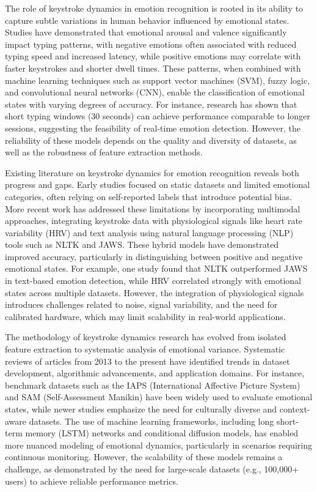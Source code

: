 \documentclass[conference]{IEEEtran}
\begin{document}
The role of keystroke dynamics in emotion recognition is rooted in its ability to capture subtle variations in human behavior influenced by emotional states. Studies have demonstrated that emotional arousal and valence significantly impact typing patterns, with negative emotions often associated with reduced typing speed and increased latency, while positive emotions may correlate with faster keystrokes and shorter dwell times. These patterns, when combined with machine learning techniques such as support vector machines (SVM), fuzzy logic, and convolutional neural networks (CNN), enable the classification of emotional states with varying degrees of accuracy. For instance, research has shown that short typing windows (30 seconds) can achieve performance comparable to longer sessions, suggesting the feasibility of real-time emotion detection. However, the reliability of these models depends on the quality and diversity of datasets, as well as the robustness of feature extraction methods.  

Existing literature on keystroke dynamics for emotion recognition reveals both progress and gaps. Early studies focused on static datasets and limited emotional categories, often relying on self-reported labels that introduce potential bias. More recent work has addressed these limitations by incorporating multimodal approaches, integrating keystroke data with physiological signals like heart rate variability (HRV) and text analysis using natural language processing (NLP) tools such as NLTK and JAWS. These hybrid models have demonstrated improved accuracy, particularly in distinguishing between positive and negative emotional states. For example, one study found that NLTK outperformed JAWS in text-based emotion detection, while HRV correlated strongly with emotional states across multiple datasets. However, the integration of physiological signals introduces challenges related to noise, signal variability, and the need for calibrated hardware, which may limit scalability in real-world applications.  

The methodology of keystroke dynamics research has evolved from isolated feature extraction to systematic analysis of emotional variance. Systematic reviews of articles from 2013 to the present have identified trends in dataset development, algorithmic advancements, and application domains. For instance, benchmark datasets such as the IAPS (International Affective Picture System) and SAM (Self-Assessment Manikin) have been widely used to evaluate emotional states, while newer studies emphasize the need for culturally diverse and context-aware datasets. The use of machine learning frameworks, including long short-term memory (LSTM) networks and conditional diffusion models, has enabled more nuanced modeling of emotional dynamics, particularly in scenarios requiring continuous monitoring. However, the scalability of these models remains a challenge, as demonstrated by the need for large-scale datasets (e.g., 100,000+ users) to achieve reliable performance metrics.  
\end{document}

